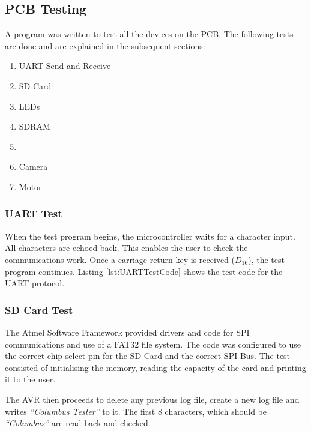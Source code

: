 \subsection{PCB Testing}
A program was written to test all the devices on the PCB. The following tests are done and are explained in the subsequent sections:
\begin{enumerate}
\item[\ref{UART:Test}] UART Send and Receive
\item[\ref{SD:Test}] SD Card 
\item[\ref{LED:Test}] LEDs 
\item[\ref{SDRAM:Test}] SDRAM 
\item[\ref{I2C:Test}] \itc 
\item[\ref{Camera:Test}] Camera 
\item[\ref{Motor:Test}] Motor 
\end{enumerate}


\subsubsection{UART Test}\label{UART:Test}
When the test program begins, the microcontroller waits for a character input. All characters are echoed back. This enables the user to check the communications work. Once a carriage return key is received ($D_{16}$), the test program continues. Listing \ref{lst:UARTTestCode} shows the test code for the UART protocol.




\subsubsection{SD Card Test}\label{SD:Test}
The Atmel Software Framework \citep{Atmel:ASF} provided drivers and code for SPI communications and use of a FAT32 file system. The code was configured to use the correct chip select pin for the SD Card and the correct SPI Bus. The test consisted of initialising the memory, reading the capacity of the card and printing it to the user. 

The AVR then proceeds to delete any previous log file, create a new log file and writes \textit{``Columbus Tester''} to it. The first 8 characters, which should be \textit{``Columbus''} are read back and checked.


